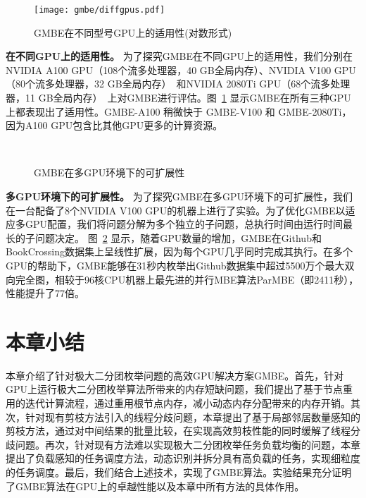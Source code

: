 \begin{figure} [H]
	\centering
	\texttt{[image: gmbe/diffgpus.pdf]}	
	\vspace{0.1in}
  \caption{GMBE在不同型号GPU上的适用性(对数形式)}
	\label{fig:gmbe_exp_diff}
\end{figure}

\textbf{在不同GPU上的适用性。} 为了探究GMBE在不同GPU上的适用性，我们分别在NVIDIA A100 GPU（108个流多处理器，40 GB全局内存）、NVIDIA V100 GPU（80个流多处理器，32 GB全局内存）~\cite{NVIDIA-V100}和NVIDIA 2080Ti GPU（68个流多处理器，11 GB全局内存）~\cite{NVIDIA-2080Ti}上对GMBE进行评估。图~\ref{fig:gmbe_exp_diff} 显示GMBE在所有三种GPU上都表现出了适用性。GMBE-A100 稍微快于 GMBE-V100 和 GMBE-2080Ti，因为A100 GPU包含比其他GPU更多的计算资源。

\begin{figure} [t]
	\centering

	 \\


	\caption{GMBE在多GPU环境下的可扩展性}

	\label{fig:gmbe_exp_scale}

\end{figure}

\textbf{多GPU环境下的可扩展性。} 为了探究GMBE在多GPU环境下的可扩展性，我们在一台配备了8个NVIDIA V100 GPU的机器上进行了实验。为了优化GMBE以适应多GPU配置，我们将问题分解为多个独立的子问题，总执行时间由运行时间最长的子问题决定。 图~\ref{fig:gmbe_exp_scale} 显示，随着GPU数量的增加，GMBE在Github和BookCrossing数据集上呈线性扩展，因为每个GPU几乎同时完成其执行。在多个GPU的帮助下，GMBE能够在31秒内枚举出Github数据集中超过5500万个最大双向完全图，相较于96核CPU机器上最先进的并行MBE算法ParMBE（即2411秒），性能提升了77倍。

\section{本章小结}

本章介绍了针对极大二分团枚举问题的高效GPU解决方案GMBE。首先，针对GPU上运行极大二分团枚举算法所带来的内存短缺问题，我们提出了基于节点重用的迭代计算流程，通过重用根节点内存，减小动态内存分配带来的内存开销。其次，针对现有剪枝方法引入的线程分歧问题，本章提出了基于局部邻居数量感知的剪枝方法，通过对中间结果的批量比较，在实现高效剪枝性能的同时缓解了线程分歧问题。再次，针对现有方法难以实现极大二分团枚举任务负载均衡的问题，本章提出了负载感知的任务调度方法，动态识别并拆分具有高负载的任务，实现细粒度的任务调度。最后，我们结合上述技术，实现了GMBE算法。实验结果充分证明了GMBE算法在GPU上的卓越性能以及本章中所有方法的具体作用。